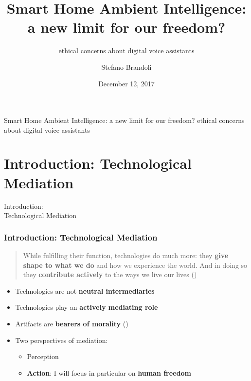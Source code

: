 \documentclass{beamer}
\title{Smart Home Ambient Intelligence: \\a new limit for our freedom?}
\subtitle{\vspace*{0.3cm}ethical concerns about digital voice assistants}
\author[Stefano Brandoli]{Stefano Brandoli}
\institute[PoliMi]{Politecnico di Milano}
\date{December 12, 2017}
\begin{document}
\begin{frame}
\maketitle
\end{frame}

\begin{frame}
\begin{center}{\vspace*{-0.5cm}Smart Home Ambient Intelligence: a new limit for our freedom?
ethical concerns about digital voice assistants}
\end{center}


\tableofcontents
\end{frame}

\section{Introduction: Technological Mediation}

\begin{frame}
\begin{center}
	 Introduction:\\Technological Mediation
\end{center}
\end{frame}

\begin{frame}
\frametitle{Introduction: Technological Mediation}
\begin{quote}
	While fulfilling their function, technologies do
much more: they \textbf{give shape to what we do} and how we experience the world.
And in doing so they \textbf{contribute actively} to the ways we live our lives (\cite{verbeek2011moralizing})
\end{quote}

\begin{itemize}
	\item Technologies are not \textbf{neutral intermediaries}
	\item Technologies play an \textbf{actively mediating role} 
	\item Artifacts are \textbf{bearers of morality} (\cite{latour1992})%
\end{itemize}

\begin{itemize}
	\item Two perspectives of mediation:
	\begin{itemize}
		\item Perception
		\item \textbf{Action}: %
		I will focus in particular on \textbf{human freedom}
	\end{itemize}
\end{itemize}
\end{frame}
\end{document}

